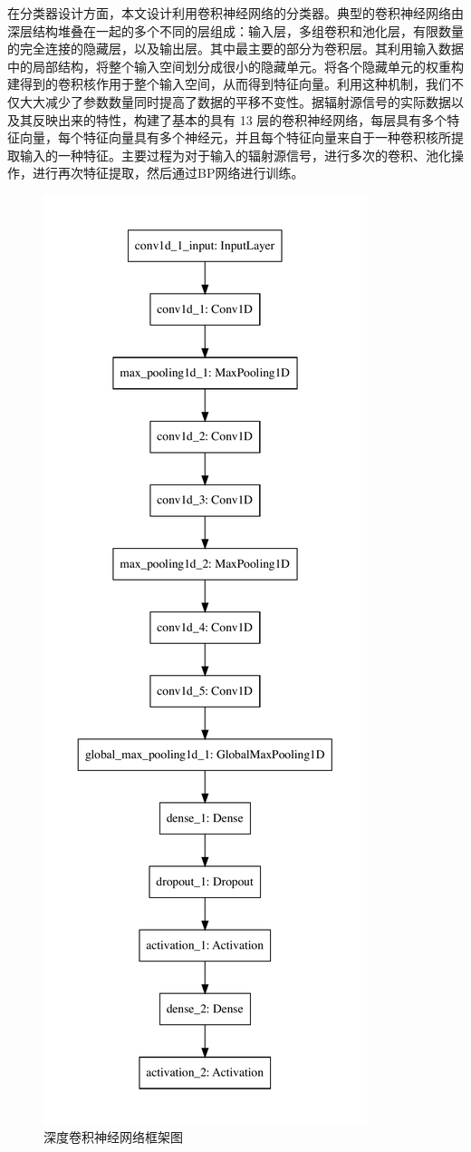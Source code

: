 在分类器设计方面，本文设计利用卷积神经网络的分类器。典型的卷积神经网络由深层结构堆叠在一起的多个不同的层组成：输入层，多组卷积和池化层，有限数量的完全连接的隐藏层，以及输出层。其中最主要的部分为卷积层。其利用输入数据中的局部结构，将整个输入空间划分成很小的隐藏单元。将各个隐藏单元的权重构建得到的卷积核作用于整个输入空间，从而得到特征向量。利用这种机制，我们不仅大大减少了参数数量同时提高了数据的平移不变性。据辐射源信号的实际数据以及其反映出来的特性，构建了基本的具有 13 层的卷积神经网络，每层具有多个特征向量，每个特征向量具有多个神经元，并且每个特征向量来自于一种卷积核所提取输入的一种特征。主要过程为对于输入的辐射源信号，进行多次的卷积、池化操作，进行再次特征提取，然后通过BP网络进行训练。
\begin{figure}
	\centering
	\includegraphics{figures/cnn.pdf}
	\caption{深度卷积神经网络框架图}
\end{figure}


